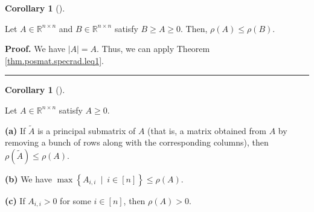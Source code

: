 \documentclass[numbers=enddot,12pt,final,onecolumn,notitlepage]{scrartcl}%
\numberwithin{exer}{subsection}
\theoremstyle{definition}
\newtheorem{coro}[theo]{Corollary}
\newenvironment{corollary}[1][]
{\begin{coro}[#1]\begin{leftbar}}
{\end{leftbar}\end{coro}}
\newenvironment{proof}[1][Proof]{\noindent\textbf{#1.} }{\ \rule{0.5em}{0.5em}}
\begin{document}
\begin{corollary}
\label{cor.posmat.specrad.leq1b}Let $A\in\mathbb{R}^{n\times n}$ and
$B\in\mathbb{R}^{n\times n}$ satisfy $B\geq A\geq0$. Then, $\rho\left(
A\right)  \leq\rho\left(  B\right)  $.
\end{corollary}

\begin{proof}
We have $\left\vert A\right\vert =A$. Thus, we can apply Theorem
\ref{thm.posmat.specrad.leq1}.
\end{proof}

\begin{corollary}
\label{cor.posmat.specrad.leq1c}Let $A\in\mathbb{R}^{n\times n}$ satisfy
$A\geq0$. \medskip

\textbf{(a)} If $\widetilde{A}$ is a principal submatrix of $A$ (that is, a
matrix obtained from $A$ by removing a bunch of rows along with the
corresponding columns), then $\rho\left(  \widetilde{A}\right)  \leq
\rho\left(  A\right)  $. \medskip

\textbf{(b)} We have $\max\left\{  A_{i,i}\ \mid\ i\in\left[  n\right]
\right\}  \leq\rho\left(  A\right)  $. \medskip

\textbf{(c)} If $A_{i,i}>0$ for some $i\in\left[  n\right]  $, then
$\rho\left(  A\right)  >0$.
\end{corollary}
\end{document}
